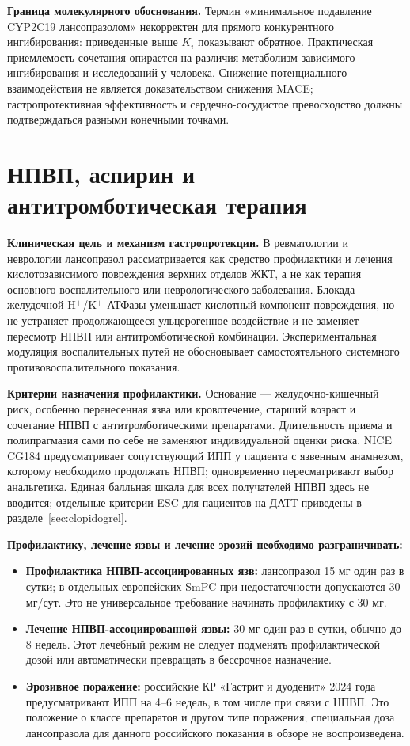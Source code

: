\documentclass[11pt,a4paper,notitlepage]{report}
\newcommand{\src}[1]{\unskip\space\cite{#1}}
\begin{document}
\textbf{Граница молекулярного обоснования.} Термин «минимальное подавление CYP2C19 лансопразолом» некорректен для прямого конкурентного ингибирования: приведенные выше $K_i$ показывают обратное. Практическая приемлемость сочетания опирается на различия метаболизм-зависимого ингибирования и исследований у человека. Снижение потенциального взаимодействия не является доказательством снижения MACE; гастропротективная эффективность и сердечно-сосудистое превосходство должны подтверждаться разными конечными точками.\src{cardioli2004,cardioogilvie2011,cardiofrelinger2012,cardiocogent2010}

\section{НПВП, аспирин и антитромботическая терапия}
\label{sec:nsaid}
\textbf{Клиническая цель и механизм гастропротекции.} В ревматологии и неврологии лансопразол рассматривается как средство профилактики и лечения кислотозависимого повреждения верхних отделов ЖКТ, а не как терапия основного воспалительного или неврологического заболевания. Блокада желудочной H$^+$/K$^+$-АТФазы уменьшает кислотный компонент повреждения, но не устраняет продолжающееся ульцерогенное воздействие и не заменяет пересмотр НПВП или антитромботической комбинации. Экспериментальная модуляция воспалительных путей не обосновывает самостоятельного системного противовоспалительного показания.\src{uslabel,nice,molnrf2}

\textbf{Критерии назначения профилактики.} Основание --- желудочно-кишечный риск, особенно перенесенная язва или кровотечение, старший возраст и сочетание НПВП с антитромботическими препаратами. Длительность приема и полипрагмазия сами по себе не заменяют индивидуальной оценки риска. NICE CG184 предусматривает сопутствующий ИПП у пациента с язвенным анамнезом, которому необходимо продолжать НПВП; одновременно пересматривают выбор анальгетика. Единая балльная шкала для всех получателей НПВП здесь не вводится; отдельные критерии ESC для пациентов на ДАТТ приведены в разделе~\ref{sec:clopidogrel}.\src{nice,hpra}

\textbf{Профилактику, лечение язвы и лечение эрозий необходимо разграничивать:}
\begin{itemize}
\item \textbf{Профилактика НПВП-ассоциированных язв:} лансопразол 15 мг один раз в сутки; в отдельных европейских SmPC при недостаточности допускаются 30 мг/сут. Это не универсальное требование начинать профилактику с 30 мг.\src{uslabel,hpra}
\item \textbf{Лечение НПВП-ассоциированной язвы:} 30 мг один раз в сутки, обычно до 8 недель. Этот лечебный режим не следует подменять профилактической дозой или автоматически превращать в бессрочное назначение.\src{uslabel,hpra}
\item \textbf{Эрозивное поражение:} российские КР «Гастрит и дуоденит» 2024 года предусматривают ИПП на 4--6 недель, в том числе при связи с НПВП. Это положение о классе препаратов и другом типе поражения; специальная доза лансопразола для данного российского показания в обзоре не воспроизведена.\src{rfgastrit}
\end{itemize}
\end{document}
